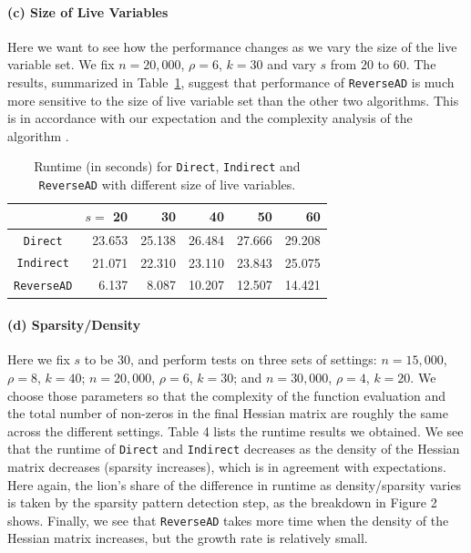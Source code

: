 \documentclass[11pt, a4paper, english]{article}
\begin{document}
\paragraph{(c) Size of Live Variables} 
Here we want to see how the performance changes as we vary the size of the live variable set.
We fix $n = 20,000$, $\rho = 6$, $k = 30$ and vary $s$ from $20$ to $60$. The results, summarized in Table~\ref{tab:live}, suggest that performance of {\tt ReverseAD} is much more sensitive to the size of live variable set than the other two algorithms. This is in accordance with our expectation and the complexity analysis of the algorithm \cite{wang2016capitalizing}.
\begin{table}[htbp]
\begin{center}
\begin{tabular}{ | c | r | r | r | r | r |}
\hline
& $s=$ 20 & 30 & 40 & 50 & 60 \\
\hline
{\tt Direct} & 23.653 & 25.138 & 26.484 & 27.666 & 29.208\\
{\tt Indirect} & 21.071 & 22.310 & 23.110 & 23.843 & 25.075\\
{\tt ReverseAD} & 6.137 & 8.087 & 10.207 & 12.507 & 14.421\\
\hline 
\end{tabular}
\caption{Runtime (in seconds) for {\tt Direct}, {\tt Indirect} and {\tt ReverseAD} with different size of live variables.}
\label{tab:live}
\end{center}
\end{table}

\paragraph{(d) Sparsity/Density} 
Here we fix $s$ to be  $30$, and perform tests on three sets of settings: $n=15,000$, $\rho = 8$, $k=40$; $n=20,000$, $\rho=6$, $k=30$; and $n=30,000$, $\rho=4$, $k=20$. 
We choose those parameters so that the complexity of the function evaluation and the total number of non-zeros in the final Hessian matrix are roughly the same across the different settings. 
Table 4 lists the runtime results we obtained.
We see that the runtime of {\tt Direct} and {\tt Indirect} decreases as the density of the Hessian matrix decreases (sparsity increases), which is in agreement with expectations.
Here again, the lion's share of the difference in runtime as density/sparsity varies is taken by the sparsity pattern detection step, as the breakdown in Figure 2 shows. 
Finally, we see that {\tt ReverseAD} takes more time when the density of the Hessian matrix increases, but the growth rate is relatively small.
\end{document}
